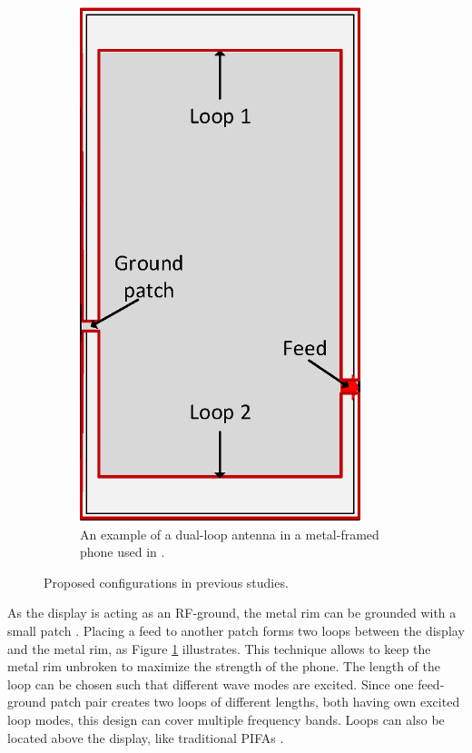 \begin{figure}[ht!]
\begin{subfigure}[b]{0.4\textwidth}
        \includegraphics[width=0.9\textwidth]{img/dual_loop.eps}
        \caption{An example of a dual-loop antenna in a metal-framed phone used in \cite{ban_dual_loop, stanley_lte_mimo}.}
        \label{fig:dual_loop}
    \end{subfigure}
    \caption{Proposed configurations in previous studies.}
    \label{fig:metal_rim_examples}
\end{figure}

As the display is acting as an RF-ground, the metal rim can be grounded with a small patch \cite{ban_dual_loop, stanley_lte_mimo}. Placing a feed to another patch forms two loops between the display and the metal rim, as Figure \ref{fig:dual_loop} illustrates. This technique allows to keep the metal rim unbroken to maximize the strength of the phone. The length of the loop can be chosen such that different wave modes are excited. Since one feed-ground patch pair creates two loops of different lengths, both having own excited loop modes, this design can cover multiple frequency bands. Loops can also be located above the display, like traditional PIFAs \cite{reconf_narrow,hybrid}. %

